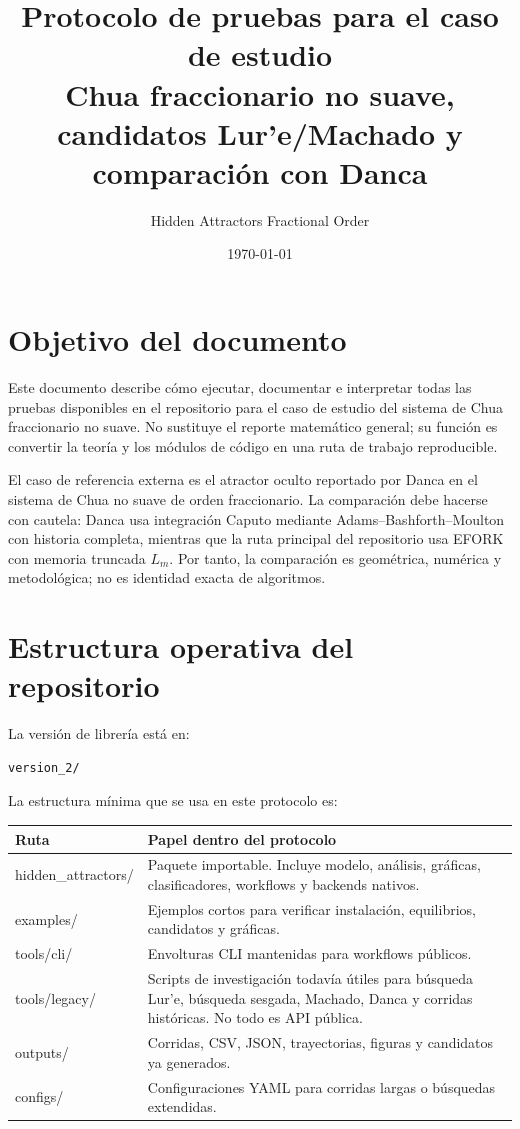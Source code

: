 \documentclass[11pt]{article}
\title{Protocolo de pruebas para el caso de estudio\\
\large Chua fraccionario no suave, candidatos Lur'e/Machado y comparación con Danca}
\author{Hidden Attractors Fractional Order}
\date{\today}
\DeclareRobustCommand{\codepath}[1]{\begingroup\Urlmuskip=0mu plus 2mu\path{#1}\endgroup}
\def\codepath#1{#1}%
\begin{document}
\maketitle
\tableofcontents

\section{Objetivo del documento}

Este documento describe cómo ejecutar, documentar e interpretar todas las pruebas disponibles en el repositorio para el caso de estudio del sistema de Chua fraccionario no suave. No sustituye el reporte matemático general; su función es convertir la teoría y los módulos de código en una ruta de trabajo reproducible.

El caso de referencia externa es el atractor oculto reportado por Danca en el sistema de Chua no suave de orden fraccionario. La comparación debe hacerse con cautela: Danca usa integración Caputo mediante Adams--Bashforth--Moulton con historia completa, mientras que la ruta principal del repositorio usa EFORK con memoria truncada \(L_m\). Por tanto, la comparación es geométrica, numérica y metodológica; no es identidad exacta de algoritmos.

\section{Estructura operativa del repositorio}

La versión de librería está en:

\begin{lstlisting}
version_2/
\end{lstlisting}

La estructura mínima que se usa en este protocolo es:

\begin{center}
\small
\begin{tabular}{@{}L{0.35\textwidth}L{0.56\textwidth}@{}}
\toprule
Ruta & Papel dentro del protocolo\\
\midrule
\codepath{hidden_attractors/} & Paquete importable. Incluye modelo, análisis, gráficas, clasificadores, workflows y backends nativos.\\
\codepath{examples/} & Ejemplos cortos para verificar instalación, equilibrios, candidatos y gráficas.\\
\codepath{tools/cli/} & Envolturas CLI mantenidas para workflows públicos.\\
\codepath{tools/legacy/} & Scripts de investigación todavía útiles para búsqueda Lur'e, búsqueda sesgada, Machado, Danca y corridas históricas. No todo es API pública.\\
\codepath{outputs/} & Corridas, CSV, JSON, trayectorias, figuras y candidatos ya generados.\\
\codepath{configs/} & Configuraciones YAML para corridas largas o búsquedas extendidas.\\
\bottomrule
\end{tabular}
\end{center}
\end{document}
